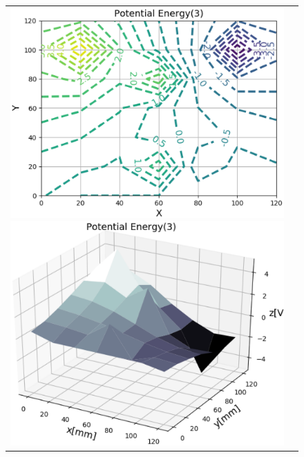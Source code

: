 \documentclass[uplatex,a4paper,11pt,oneside,openany]{jsbook}
\begin{document}
\vfill
\begin{figure}[H]
  \centering
  \begin{tabular}{ll}
      \begin{minipage}{0.5\hsize}
        \centering
        \includegraphics[scale=0.5]{./figure/contr5.eps}
      \end{minipage}
      \begin{minipage}{0.5\hsize}
        \centering
        \includegraphics[scale=0.5]{./figure/contr6.eps}
      \end{minipage}
    \end{tabular}
\end{figure}%
\end{document}
